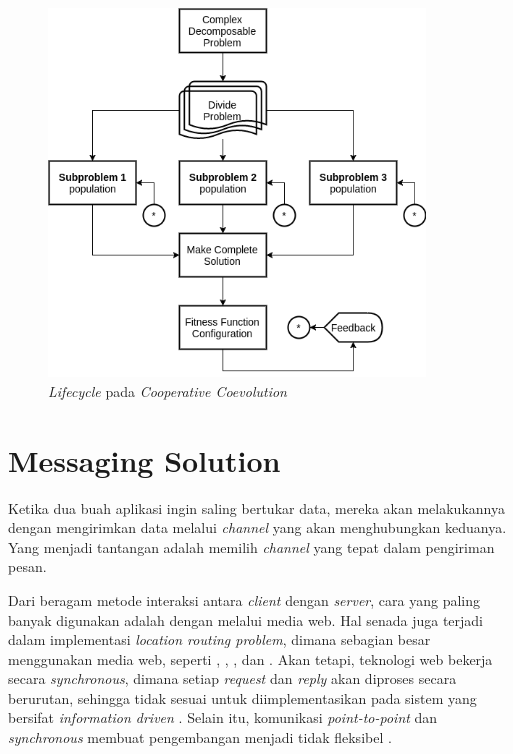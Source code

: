 \begin{figure}[!]
	\centering
	\includegraphics[width=10cm]{Resources/Images/coes_overview}
	\captionsetup{format=hang}
	\caption{\textit{Lifecycle} pada \textit{Cooperative Coevolution} \citep{de_oliveira_cooperative_2016}}
	\label{fig:coes_lifecycle}
\end{figure}


\section{Messaging Solution}
\label{sec:messaging-solution}


Ketika dua buah aplikasi ingin saling bertukar data, mereka akan melakukannya dengan mengirimkan data melalui \textit{channel} yang akan menghubungkan keduanya. Yang menjadi tantangan adalah memilih \textit{channel} yang tepat dalam pengiriman pesan.


Dari beragam metode interaksi antara \textit{client} dengan \textit{server}, cara yang paling banyak digunakan adalah dengan melalui media web. Hal senada juga terjadi dalam implementasi \textit{location routing problem}, dimana sebagian besar menggunakan media web, seperti \citep{weise_solving_2009}, \citep{sengoku_fast_1998}, \citep{sarmenta_bayanihan_2002}, dan \citep{diaz_vrp_2012}. Akan tetapi, teknologi web bekerja secara \textit{synchronous}, dimana setiap \textit{request} dan \textit{reply} akan diproses secara berurutan, sehingga tidak sesuai untuk diimplementasikan pada sistem yang bersifat \textit{information driven} \citep{muhl_large-scale_2002}. Selain itu, komunikasi \textit{point-to-point} dan \textit{synchronous} membuat pengembangan menjadi tidak fleksibel \citep{eugster_many_2003}.


